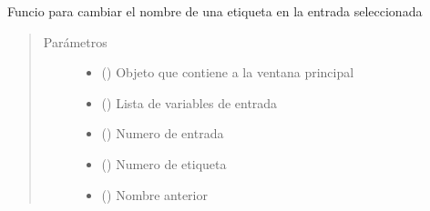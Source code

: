 \documentclass[letterpaper,10pt,spanish]{sphinxmanual}
\begin{document}
\begin{fulllineitems}
\begin{fulllineitems}
\begin{quote}
\begin{description}
\begin{itemize}
\end{itemize}

\end{description}\end{quote}

\end{fulllineitems}


\begin{fulllineitems}
\label{\detokenize{codigos/rutinas_fuzzy:rutinas_fuzzy.FuzzyController.cambio_etinombre_input}}
Funcio para cambiar el nombre de una etiqueta en la entrada seleccionada
\begin{quote}\begin{description}
\item[{Parámetros}] \leavevmode\begin{itemize}
\item {} 
 () \textendash{} Objeto que contiene a la ventana principal

\item {} 
 () \textendash{} Lista de variables de entrada

\item {} 
 () \textendash{} Numero de entrada

\item {} 
 () \textendash{} Numero de etiqueta

\item {} 
 () \textendash{} Nombre anterior

\end{itemize}

\end{description}\end{quote}

\end{fulllineitems}


\end{fulllineitems}
\end{document}
